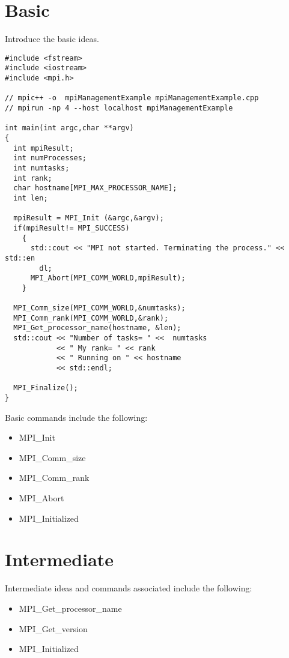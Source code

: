 
\section{Basic}

Introduce the basic ideas.

\lstset{language=C++, numbers=left, numberstyle=\tiny, stepnumber=1,
  numbersep=5pt, commentstyle=\scriptsize}
\begin{lstlisting}[caption={Basic Process Information},
                   basicstyle=\scriptsize,
                   label=listing:touch]
#include <fstream>
#include <iostream>
#include <mpi.h>

// mpic++ -o  mpiManagementExample mpiManagementExample.cpp 
// mpirun -np 4 --host localhost mpiManagementExample

int main(int argc,char **argv)
{
  int mpiResult;
  int numProcesses;
  int numtasks;
  int rank;
  char hostname[MPI_MAX_PROCESSOR_NAME];
  int len;

  mpiResult = MPI_Init (&argc,&argv);
  if(mpiResult!= MPI_SUCCESS)
    {
      std::cout << "MPI not started. Terminating the process." << std::en
        dl;
      MPI_Abort(MPI_COMM_WORLD,mpiResult);
    }

  MPI_Comm_size(MPI_COMM_WORLD,&numtasks);
  MPI_Comm_rank(MPI_COMM_WORLD,&rank);
  MPI_Get_processor_name(hostname, &len);
  std::cout << "Number of tasks= " <<  numtasks
            << " My rank= " << rank
            << " Running on " << hostname
            << std::endl;

  MPI_Finalize();
}
\end{lstlisting}

Basic commands include the following: \\
\begin{itemize}
\item MPI_Init
\item MPI_Comm_size
\item MPI_Comm_rank
\item MPI_Abort
\item MPI_Initialized
\end{itemize}


\section{Intermediate}

Intermediate ideas and commands associated include the following: \\
\begin{itemize}
\item MPI_Get_processor_name
\item MPI_Get_version
\item MPI_Initialized
\end{itemize}

